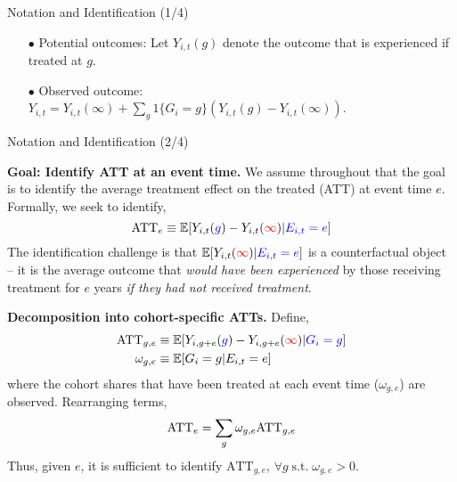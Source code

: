 \documentclass[usenames,dvipsnames]{beamer}
\begin{document}
\begin{frame}{Notation and Identification (1/4)}
\begin{itemize}
\vspace{0.1cm}
\item[$\bullet$] Potential outcomes: Let $Y_{i,t}(g)$ denote the outcome that is experienced if treated at $g$.

\vspace{0.1cm}
\item[$\bullet$] Observed outcome: $Y_{i,t} =   Y_{i,t}(\infty) + \sum_{g} 1\{G_i=g\} (Y_{i,t}(g) - Y_{i,t}(\infty))$.
\end{itemize}
 
\vspace{-0.05cm}

\end{frame}


\begin{frame}{Notation and Identification (2/4)}

\textbf{Goal: Identify ATT at an event time.} We assume throughout that the goal is to identify the average treatment effect on the treated (ATT) at event time $e$. Formally, we seek to identify,
\begin{equation} \notag
\textrm{ATT}_{e} \equiv   \mathbb{E}[Y_{i,t}({\color{blue} g}) - Y_{i,t}({\color{red} \infty}) | {\color{blue}E_{i,t}=e}]  
\end{equation}
The identification challenge is that $\mathbb{E}[ Y_{i,t}({\color{red}\infty}) | {\color{blue}E_{i,t}=e}] $ is a counterfactual object -- it is the average outcome that \textit{would have been experienced} by those receiving treatment for $e$ years  \textit{if they had not received treatment}.




\textbf{Decomposition into cohort-specific ATTs.} Define,
\begin{equation} \notag
\begin{aligned}
\textrm{ATT}_{g,e} & \equiv   \mathbb{E}[Y_{i,g+e}({\color{blue} g})- Y_{i,g+e}({\color{red}\infty}) | {\color{blue}G_i = g}]  \\
\omega_{g,e} & \equiv \mathbb{E}[G_i=g | E_{i,t}=e]
\end{aligned}
\end{equation}
where the cohort shares that have been treated at each event time ($\omega_{g,e}$) are observed. Rearranging terms,  
\begin{equation} \notag
\textrm{ATT}_{e} =  \sum_{g} \omega_{g,e} \textrm{ATT}_{g,e}
\end{equation}
Thus, given $e$, it is sufficient to identify  $\textrm{ATT}_{g,e}$, $\forall g \; \text{s.t.} \; \omega_{g,e}>0$.

\end{frame}
\end{document}
